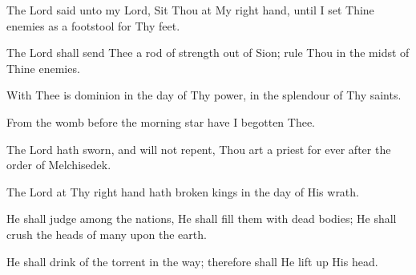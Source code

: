 The Lord said unto my Lord, Sit Thou at My right hand, until I set Thine enemies as a footstool for Thy feet.

The Lord shall send Thee a rod of strength out of Sion; rule Thou in the midst of Thine enemies.

With Thee is dominion in the day of Thy power, in the splendour of Thy saints.

From the womb before the morning star have I begotten Thee.

The Lord hath sworn, and will not repent, Thou art a priest for ever after the order of Melchisedek.

The Lord at Thy right hand hath broken kings in the day of His wrath.

He shall judge among the nations, He shall fill them with dead bodies; He shall crush the heads of many upon the earth.

He shall drink of the torrent in the way; therefore shall He lift up His head.
